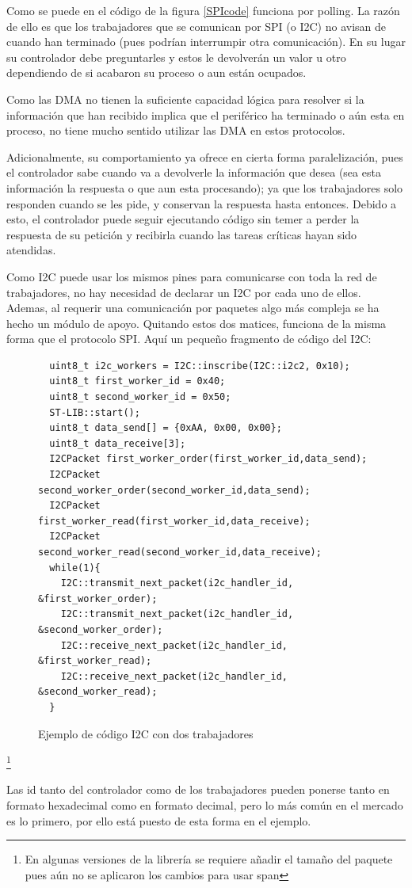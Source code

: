 \documentclass{report}
\begin{document}
\par \vspace{0.3cm}
Como se puede en el código de la figura \ref{SPIcode} funciona por polling. La razón de ello es que los trabajadores que se comunican por SPI (o I2C) no avisan de cuando han terminado (pues podrían interrumpir otra comunicación). En su lugar su controlador debe preguntarles y estos le devolverán un valor u otro dependiendo de si acabaron su proceso o aun están ocupados. \par
Como las DMA no tienen la suficiente capacidad lógica para resolver si la información que han recibido implica que el periférico ha terminado o aún esta en proceso, no tiene mucho sentido utilizar las DMA en estos protocolos. \par 
Adicionalmente, su comportamiento ya ofrece en cierta forma paralelización, pues el controlador sabe cuando va a devolverle la información que desea (sea esta información la respuesta o que aun esta procesando); ya que los trabajadores solo responden cuando se les pide, y conservan la respuesta hasta entonces. Debido a esto, el controlador puede seguir ejecutando código sin temer a perder la respuesta de su petición y recibirla cuando las tareas críticas hayan sido atendidas. 
\par \vspace{0.3cm}
Como I2C puede usar los mismos pines para comunicarse con toda la red de trabajadores, no hay necesidad de declarar un I2C por cada uno de ellos. Ademas, al requerir una comunicación por paquetes algo más compleja se ha hecho un módulo de apoyo. Quitando estos dos matices, funciona de la misma forma que el protocolo SPI. Aquí un pequeño fragmento de código del I2C:
\begin{figure}[h]
\begin{lstlisting}
  uint8_t i2c_workers = I2C::inscribe(I2C::i2c2, 0x10);
  uint8_t first_worker_id = 0x40;
  uint8_t second_worker_id = 0x50;
  ST-LIB::start();
  uint8_t data_send[] = {0xAA, 0x00, 0x00}; 
  uint8_t data_receive[3]; 
  I2CPacket first_worker_order(first_worker_id,data_send);
  I2CPacket second_worker_order(second_worker_id,data_send);
  I2CPacket first_worker_read(first_worker_id,data_receive);
  I2CPacket second_worker_read(second_worker_id,data_receive);
  while(1){
    I2C::transmit_next_packet(i2c_handler_id, &first_worker_order);
    I2C::transmit_next_packet(i2c_handler_id, &second_worker_order);
    I2C::receive_next_packet(i2c_handler_id, &first_worker_read);
    I2C::receive_next_packet(i2c_handler_id, &second_worker_read);
  }
\end{lstlisting}
\caption{Ejemplo de código I2C con dos trabajadores}
\label{I2Ccode}
\end{figure}
\footnote{En algunas versiones de la librería se requiere añadir el tamaño del paquete pues aún no se aplicaron los cambios para usar span}
\par \vspace{0.3cm}
Las id tanto del controlador como de los trabajadores pueden ponerse tanto en formato hexadecimal como en formato decimal, pero lo más común en el mercado es lo primero, por ello está puesto de esta forma en el ejemplo. 
\end{document}
